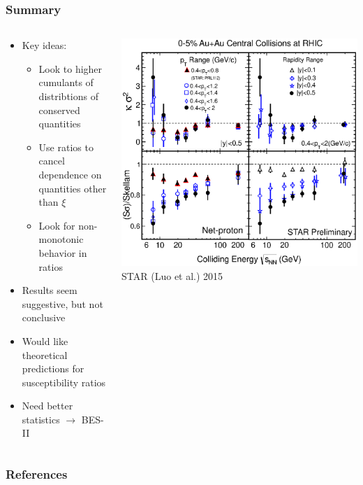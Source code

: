 \documentclass[accentcolor=tud2c,usenames,dvipsnames,colorbacktitle,inverttitle,landscape,german,presentation,t]{tudbeamer}
\begin{document}
  \begin{frame}
    \frametitle{Summary}
    \begin{columns}[c]
      \begin{column}{0.6\textwidth}
        \begin{itemize}
          \item Key ideas:
          \begin{itemize}
            \item Look to higher cumulants of distribtions of conserved
              quantities
            \item Use ratios to cancel dependence on quantities other than
              $\xi$
            \item Look for non-monotonic behavior in ratios
          \end{itemize}
          \item Results seem suggestive, but not conclusive
          \item Would like theoretical predictions for susceptibility ratios
          \item Need better statistics $\rightarrow$ BES-II
        \end{itemize}
      \end{column}
      \begin{column}{0.4\textwidth}
        \begin{center}
          \includegraphics[width=\textwidth]{figures/14/PT_Y_Energy}
          \\\footnotesize{STAR (Luo et al.) 2015}
        \end{center}
      \end{column}
    \end{columns}
  \end{frame}


  \begin{frame}[allowframebreaks]
    \frametitle{References}
    
    
  \end{frame}
\end{document}
